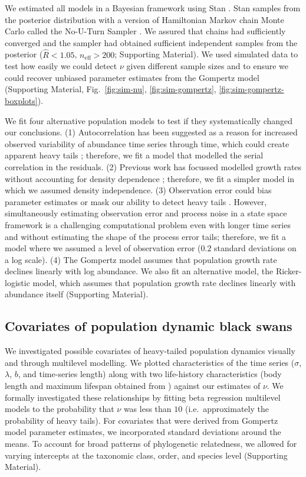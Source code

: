 We estimated all models in a Bayesian framework using Stan
\citep{stan-manual2014}. Stan samples from the posterior distribution with
a version of Hamiltonian Markov chain Monte Carlo called the No-U-Turn Sampler
\citep{hoffman2014}. We assured that chains had sufficiently converged and the
sampler had obtained sufficient independent samples from the posterior
($\widehat{R} < 1.05$, $n_\mathrm{eff} > 200$; Supporting Material). We used
simulated data to test how easily we could detect $\nu$ given different sample
sizes and to ensure we could recover unbiased parameter estimates from the
Gompertz model (Supporting Material, Fig.~\ref{fig:sim-nu},
\ref{fig:sim-gompertz}, \ref{fig:sim-gompertz-boxplots}).

We fit four alternative population models to test if they systematically
changed our conclusions. (1) Autocorrelation has been suggested as a reason for
increased observed variability of abundance time series through time, which
could create apparent heavy tails \citep{inchausti2002}; therefore, we fit
a model that modelled the serial correlation in the residuals. (2) Previous
work has focussed modelled growth rates without accounting for density
dependence \citep{segura2013}; therefore, we fit a simpler model in which we
assumed density independence. (3) Observation error could bias parameter
estimates \citep{knape2012} or mask our ability to detect heavy tails
\citep{ward2007}. However, simultaneously estimating observation error and
process noise in a state space framework is a challenging computational problem
\citep[e.g.][]{dennis2006, knape2008} even with longer time series and without
estimating the shape of the process error tails; therefore, we fit a model
where we assumed a level of observation error ($0.2$ standard deviations on
a log scale). (4) The Gompertz model assumes that population growth rate
declines linearly with log abundance. We also fit an alternative model, the
Ricker-logistic model, which assumes that population growth rate declines
linearly with abundance itself (Supporting Material).

\subsection{Covariates of population dynamic black swans}

We investigated possible covariates of heavy-tailed population dynamics
visually and through multilevel modelling. We plotted characteristics of the
time series ($\sigma$, $\lambda$, $b$, and time-series length) along with two
life-history characteristics (body length and maximum lifespan obtained from
\citet{brook2006a}) against our estimates of $\nu$. We formally investigated
these relationships by fitting beta regression multilevel models to the
probability that $\nu$ was less than $10$ (i.e.~approximately the probability
of heavy tails). For covariates that were derived from Gompertz model parameter
estimates, we incorporated standard deviations around the means. To account for
broad patterns of phylogenetic relatedness, we allowed for varying intercepts
at the taxonomic class, order, and species level (Supporting Material).

